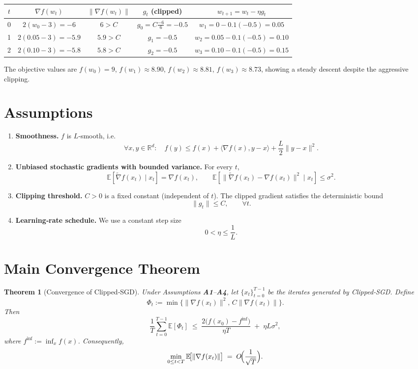 \documentclass{article}
\newtheorem{theorem}{Theorem}
\newcommand{\E}{\mathbb{E}}
\begin{document}
\begin{center}
\begin{tabular}{c|c|c|c|c}
$t$ & $\nabla f(w_{t})$ & $\| \nabla f(w_{t})\|$ & $g_{t}$ (clipped) & $w_{t+1}=w_{t}-\eta g_{t}$ \\ \hline
0 & $2(w_{0}-3)=-6$ & $6>C$ & $g_{0}=C\frac{-6}{6}=-0.5$ & $w_{1}=0-0.1(-0.5)=0.05$ \\[4pt]
1 & $2(0.05-3)=-5.9$ & $5.9>C$ & $g_{1}=-0.5$ & $w_{2}=0.05-0.1(-0.5)=0.10$ \\[4pt]
2 & $2(0.10-3)=-5.8$ & $5.8>C$ & $g_{2}=-0.5$ & $w_{3}=0.10-0.1(-0.5)=0.15$ 
\end{tabular}
\end{center}
The objective values are $f(w_{0})=9$, $f(w_{1})\approx8.90$, $f(w_{2})\approx8.81$, $f(w_{3})\approx8.73$, showing a steady descent despite the aggressive clipping.

\newpage
\section*{Assumptions}
\begin{enumerate}[label={A\arabic*}.]
\item \textbf{Smoothness.} $f$ is $L$‑smooth, i.e.
\[
\forall x,y\in\mathbb{R}^{d}:\quad
f(y)\le f(x)+\langle\nabla f(x),y-x\rangle+\frac{L}{2}\|y-x\|^{2}.
\tag{A1}
\]
\item \textbf{Unbiased stochastic gradients with bounded variance.} For every $t$,
\[
\E\!\left[\widetilde{\nabla}f(x_{t})\mid x_{t}\right]=\nabla f(x_{t}),\qquad
\E\!\left[\big\|\widetilde{\nabla}f(x_{t})-\nabla f(x_{t})\big\|^{2}\mid x_{t}\right]\le\sigma^{2}.
\tag{A2}
\]
\item \textbf{Clipping threshold.} $C>0$ is a fixed constant (independent of $t$).  
The clipped gradient satisfies the deterministic bound
\[
\|g_{t}\|\le C,\qquad\forall t.
\tag{A3}
\]
\item \textbf{Learning‑rate schedule.} We use a constant step size
\[
0<\eta\le\frac{1}{L}.
\tag{A4}
\]
\end{enumerate}

\section*{Main Convergence Theorem}
\begin{theorem}[Convergence of Clipped‑SGD]\label{thm:main}
Under Assumptions \textbf{A1}–\textbf{A4}, let $\{x_{t}\}_{t=0}^{T-1}$ be the iterates generated by
Clipped‑SGD. Define
\[
\Phi_{t}:=\min\!\bigl\{\|\nabla f(x_{t})\|^{2},\,C\|\nabla f(x_{t})\|\bigr\}.
\]
Then
\[
\frac{1}{T}\sum_{t=0}^{T-1}\E[\Phi_{t}]
\;\le\;
\frac{2\bigl(f(x_{0})-f^{\inf}\bigr)}{\eta T}
\;+\;
\eta L\sigma^{2},
\tag{1}
\]
where $f^{\inf}:=\inf_{x}f(x)$. Consequently,
\[
\min_{0\le t<T}\E\!\bigl[\|\nabla f(x_{t})\|\bigr]
\;=\;O\!\Bigl(\frac{1}{\sqrt{T}}\Bigr).
\]
\end{theorem}
\end{document}
